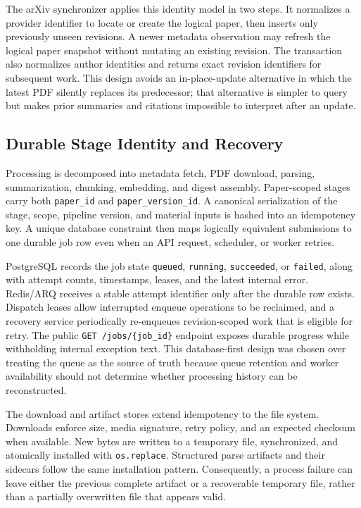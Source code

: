 The arXiv synchronizer applies this identity model in two steps. It normalizes a provider identifier to locate or create the logical paper, then inserts only previously unseen revisions. A newer metadata observation may refresh the logical paper snapshot without mutating an existing revision. The transaction also normalizes author identities and returns exact revision identifiers for subsequent work. This design avoids an in-place-update alternative in which the latest PDF silently replaces its predecessor; that alternative is simpler to query but makes prior summaries and citations impossible to interpret after an update.

\subsection{Durable Stage Identity and Recovery}

Processing is decomposed into metadata fetch, PDF download, parsing, summarization, chunking, embedding, and digest assembly. Paper-scoped stages carry both \texttt{paper\_id} and \texttt{paper\_version\_id}. A canonical serialization of the stage, scope, pipeline version, and material inputs is hashed into an idempotency key. A unique database constraint then maps logically equivalent submissions to one durable job row even when an API request, scheduler, or worker retries.

PostgreSQL records the job state \texttt{queued}, \texttt{running}, \texttt{succeeded}, or \texttt{failed}, along with attempt counts, timestamps, leases, and the latest internal error. Redis/ARQ receives a stable attempt identifier only after the durable row exists. Dispatch leases allow interrupted enqueue operations to be reclaimed, and a recovery service periodically re-enqueues revision-scoped work that is eligible for retry. The public \texttt{GET /jobs/\{job\_id\}} endpoint exposes durable progress while withholding internal exception text. This database-first design was chosen over treating the queue as the source of truth because queue retention and worker availability should not determine whether processing history can be reconstructed.

The download and artifact stores extend idempotency to the file system. Downloads enforce size, media signature, retry policy, and an expected checksum when available. New bytes are written to a temporary file, synchronized, and atomically installed with \texttt{os.replace}. Structured parse artifacts and their sidecars follow the same installation pattern. Consequently, a process failure can leave either the previous complete artifact or a recoverable temporary file, rather than a partially overwritten file that appears valid.

